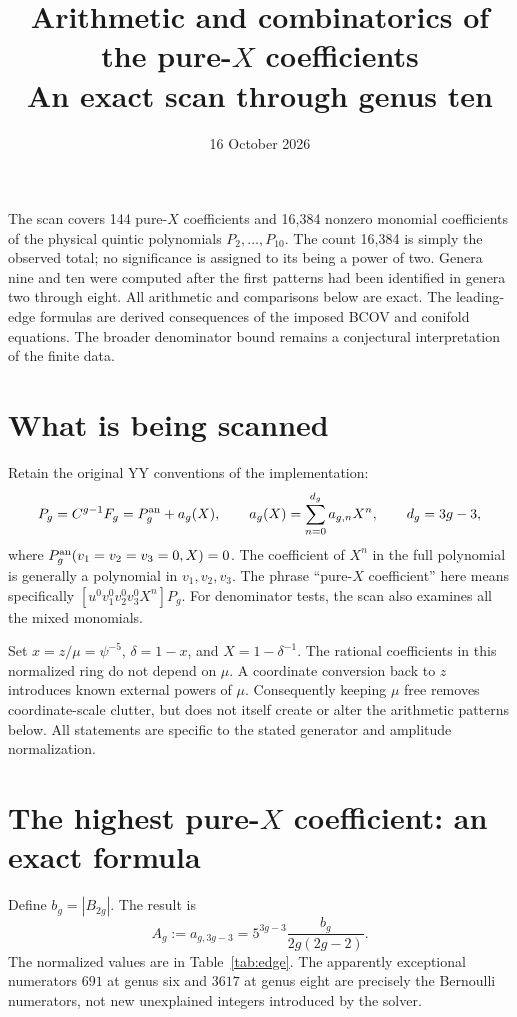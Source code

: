 \documentclass[11pt]{article}
\title{Arithmetic and combinatorics of the pure-$X$ coefficients\\An exact scan through genus ten}
\author{}\date{16 October 2026}
\begin{document}
\maketitle
\noindent
The scan covers 144 pure-$X$ coefficients and 16,384 nonzero monomial
coefficients of the physical quintic polynomials $P_2,\ldots,P_{10}$.
The count 16,384 is simply the observed total; no significance is assigned
to its being a power of two. Genera nine and ten were computed after the
first patterns had been identified in genera two through eight. All arithmetic
and comparisons below are exact. The leading-edge formulas are derived
consequences of the imposed BCOV and conifold equations. The broader denominator
bound remains a conjectural interpretation of the finite data.

\section{What is being scanned}
Retain the original YY conventions of the implementation:
\[
 P_g=C^{g-1}F_g=P_g^{\rm an}+a_g(X),\qquad
 a_g(X)=\sum_{n=0}^{d_g}a_{g,n}X^n,\qquad d_g=3g-3,
\]
where $P_g^{\rm an}(v_1=v_2=v_3=0,X)=0$.
The coefficient of $X^n$ in the full polynomial is generally a polynomial
in $v_1,v_2,v_3$. The phrase ``pure-$X$ coefficient'' here means specifically
$[u^0v_1^0v_2^0v_3^0X^n]P_g$.
For denominator tests, the scan also examines all the mixed monomials.

Set $x=z/\mu=\psi^{-5}$, $\delta=1-x$, and $X=1-\delta^{-1}$.
The rational coefficients in this normalized ring do not depend on $\mu$.
A coordinate conversion back to $z$ introduces known external powers of
$\mu$. Consequently keeping $\mu$ free removes coordinate-scale clutter, but
does not itself create or alter the arithmetic patterns below.
All statements are specific to the stated generator and amplitude normalization.

\section{The highest pure-$X$ coefficient: an exact formula}
Define $b_g=|B_{2g}|$. The result is
\begin{equation}\boxed{
 A_g:=a_{g,3g-3}=5^{3g-3}\frac{b_g}{2g(2g-2)}.}
 \label{eq:leading}
\end{equation}
The normalized values are in Table~\ref{tab:edge}. The apparently exceptional
numerators $691$ at genus six and $3617$ at genus eight are precisely the
Bernoulli numerators, not new unexplained integers introduced by the solver.
\end{document}
